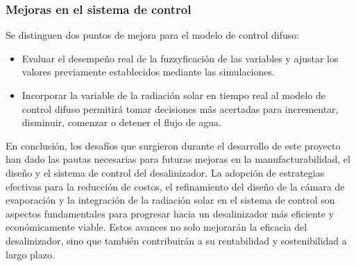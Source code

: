 		\subsubsection{Mejoras en el sistema de control}
			
			Se distinguen dos puntos de mejora para el modelo de control difuso:
			
			\begin{itemize}
				\item Evaluar el desempeño real de la fuzzyficación de las variables y ajustar los valores previamente establecidos mediante las simulaciones.
				\item Incorporar la variable de la radiación solar en tiempo real al modelo de control difuso permitirá tomar decisiones más acertadas para incrementar, disminuir, comenzar o detener el flujo de agua.
			\end{itemize}
		
		
		En conclusión, los desafíos que surgieron durante el desarrollo de este proyecto han dado las pautas necesarias para futuras mejoras en la manufacturabilidad, el diseño y el sistema de control del desalinizador. La adopción de estrategias efectivas para la reducción de costos, el refinamiento del diseño de la cámara de evaporación y la integración de la radiación solar en el sistema de control son aspectos fundamentales para progresar hacia un desalinizador más eficiente y económicamente viable. Estos avances no solo mejorarán la eficacia del desalinizador, sino que también contribuirán a su rentabilidad y sostenibilidad a largo plazo.

			
			
